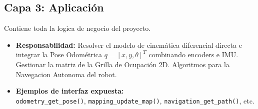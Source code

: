 \documentclass[12pt,a4paper]{article}
\begin{document}
\subsection{Capa 3: Aplicación}
Contiene toda la logica de negocio del proyecto.
\begin{itemize}
    \item \textbf{Responsabilidad:} Resolver el modelo de cinemática diferencial directa e integrar la Pose Odométrica $q = [x, y, \theta]^T$ combinando encoders e IMU. Gestionar la matriz de la Grilla de Ocupación 2D. Algoritmos para la Navegacion Autonoma del robot.
    \item \textbf{Ejemplos de interfaz expuesta:}\\
\texttt{odometry\_get\_pose()},
\texttt{mapping\_update\_map()},
\texttt{navigation\_get\_path()}, etc.
\end{itemize}
\end{document}
